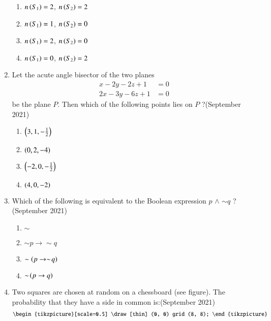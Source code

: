 \documentclass[journal,12pt,onecolumn]{IEEEtran}
\theoremstyle{remark}
\begin{document}
\begin{enumerate}
\begin{multicols}{2}
    \begin{enumerate}
    \item $n\left(S_1\right) = 2$, $n\left(S_2\right) = 2$
    \item $n\left(S_1\right) = 1$, $n\left(S_2\right) = 0$
   \item $n\left(S_1\right) = 2$, $n\left(S_2\right) = 0$
    \item $n\left(S_1\right) = 0$, $n\left(S_2\right) = 2$
    \end{enumerate}
\end{multicols}

\item Let the acute angle bisector of the two planes
\begin{align*}
x - 2y - 2z + 1 &= 0 \\
2x - 3y - 6z + 1 &= 0
\end{align*}
be the plane $P$. Then which of the following points lies on $P$ ?\hfill (September 2021)
\begin{multicols}{2}
\begin{enumerate}
    \item $\left( 3, 1, -\frac{1}{2} \right)$ \\
    \item $\left(0, 2, -4\right)$
     \item $\left( -2, 0, -\frac{1}{2} \right)$ \\
    \item $\left(4, 0, -2\right)$
\end{enumerate}
\end{multicols}

\item Which of the following is equivalent to the Boolean expression $p$  $\land$ $\sim$$q$ ?\hfill (September 2021)
\begin{multicols}{4}
\begin{enumerate}
    \item $\sim$ 
    \item  $\sim\!p \to  \sim\!q$
    \item $\sim\left(p \to  \sim\!q\right)$
    \item $\sim\!\left(p \to q\right)$ 
\end{enumerate}
\end{multicols}

\item Two squares are chosen at random on a chessboard (see figure). The probability that they have a side in common is:\hfill (September 2021)
\begin{align}
\begin{tikzpicture}[scale=0.5]
    \draw[thin] (0, 0) grid (8, 8);
\end{tikzpicture}
\end{align}



\end{enumerate}
\end{document}
